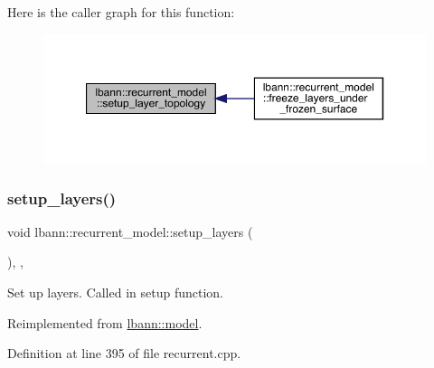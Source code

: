 Here is the caller graph for this function\+:\nopagebreak
\begin{figure}[H]
\begin{center}
\leavevmode
\includegraphics[width=350pt]{classlbann_1_1recurrent__model_ac89ddfa607e5cb6b940eb389ebbce6f6_icgraph}
\end{center}
\end{figure}
\mbox{\label{classlbann_1_1recurrent__model_a712dabb1c1e90f6e268b42f6abaedd93}} 
\subsubsection{\texorpdfstring{setup\+\_\+layers()}{setup\_layers()}}
{\footnotesize\ttfamily void lbann\+::recurrent\+\_\+model\+::setup\+\_\+layers (\begin{DoxyParamCaption}{ }\end{DoxyParamCaption})\hspace{0.3cm}{\ttfamily [override]}, {\ttfamily [protected]}, {\ttfamily [virtual]}}

Set up layers. Called in setup function. 

Reimplemented from \hyperlink{classlbann_1_1model_a989ab581e359f65c9238d627cce5b589}{lbann\+::model}.



Definition at line 395 of file recurrent.\+cpp.


